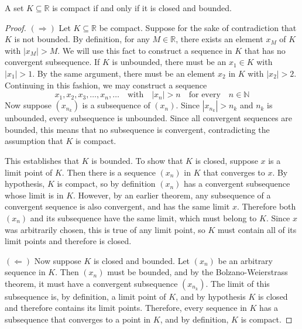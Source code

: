\par\vspace{1 cm}
\begin{theorem*} A set $K\subseteq\mathbb{R}$ is compact if and only if it is closed and bounded.
\end{theorem*}
\begin{proof}
$(\Rightarrow)$ Let $K\subseteq\mathbb{R}$ be compact.  Suppose for the sake of contradiction that $K$ is not bounded. By definition, for any $M\in\mathbb{R}$, there exists an element $x_M$ of $K$ with $|x_M|>M$.  We will use this fact to construct a sequence in $K$ that has no convergent subsequence.  If $K$ is unbounded, there must be an $x_1\in K$ with $|x_1|>1$.  By the same argument, there must be an element $x_2$ in $K$ with $|x_2|>2$.  Continuing in this fashion, we may construct a sequence
\[
x_1,x_2,x_3,\ldots,x_n,\ldots\quad\mbox{with}\quad |x_n|>n\quad\mbox{for every}\quad n\in\mathbb{N}
\]   
Now suppose $(x_{n_k})$ is a subsequence of $(x_n)$.  Since $|x_{n_k}|>n_k$ and $n_k$ is unbounded, every subsequence is unbounded.  Since all convergent sequences are bounded, this means that no subsequence is convergent, contradicting the assumption that $K$ is compact.
\par\vspace{0.3 cm}
This establishes that $K$ is bounded.  To show that $K$ is closed, suppose $x$ is a limit point of $K$.  Then there is a sequence $(x_n)$ in $K$ that converges to $x$.  By hypothesis, $K$ is compact, so by definition $(x_n)$ has a convergent subsequence whose limit is in $K$.  However, by an earlier theorem, any subsequence of a convergent sequence is also convergent, and has the same limit $x$.  Therefore both $(x_n)$ and its subsequence have the same limit, which must belong to $K$.  Since $x$ was arbitrarily chosen, this is true of any limit point, so $K$ must contain all of its limit points and therefore is closed.
\par\vspace{0.3 cm}
$(\Leftarrow)$ Now suppose $K$ is closed and bounded.  Let $(x_n)$ be an arbitrary sequence in $K$.  Then $(x_n)$ must be bounded, and by the Bolzano-Weierstrass theorem, it must have a convergent subsequence $(x_{n_k})$.  The limit of this subsequence is, by definition, a limit point of $K$, and by hypothesis $K$ is closed and therefore contains its limit points.  Therefore, every sequence in $K$ has a subsequence that converges to a point in $K$, and by definition, $K$ is compact.
      
\end{proof}
